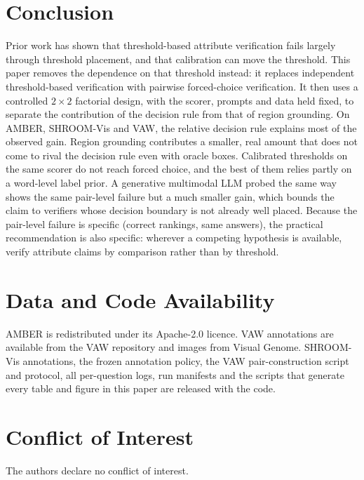 \documentclass[11pt]{article}
\begin{document}
\section{Conclusion}\label{sec:conclusion}
Prior work has shown that threshold-based attribute verification fails largely through threshold placement, and that calibration can move the threshold. This paper removes the dependence on that threshold instead: it replaces independent threshold-based verification with pairwise forced-choice verification. It then uses a controlled $2\times2$ factorial design, with the scorer, prompts and data held fixed, to separate the contribution of the decision rule from that of region grounding. On AMBER, SHROOM-Vis and VAW, the relative decision rule explains most of the observed gain. Region grounding contributes a smaller, real amount that does not come to rival the decision rule even with oracle boxes. Calibrated thresholds on the same scorer do not reach forced choice, and the best of them relies partly on a word-level label prior. A generative multimodal LLM probed the same way shows the same pair-level failure but a much smaller gain, which bounds the claim to verifiers whose decision boundary is not already well placed. Because the pair-level failure is specific (correct rankings, same answers), the practical recommendation is also specific: wherever a competing hypothesis is available, verify attribute claims by comparison rather than by threshold.

\section*{Data and Code Availability}
AMBER is redistributed under its Apache-2.0 licence. VAW annotations are available from the VAW repository and images from Visual Genome. SHROOM-Vis annotations, the frozen annotation policy, the VAW pair-construction script and protocol, all per-question logs, run manifests and the scripts that generate every table and figure in this paper are released with the code.

\section*{Conflict of Interest}
The authors declare no conflict of interest.



\end{document}
